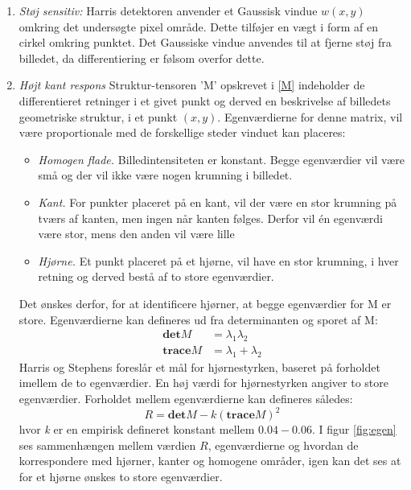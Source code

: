 \begin{enumerate}
\item{\textit{Støj sensitiv:} Harris detektoren anvender et Gaussisk vindue $w(x,y)$ omkring det undersøgte pixel område. Dette tilføjer en vægt i form af en cirkel omkring punktet. Det Gaussiske vindue anvendes til at fjerne støj fra billedet, da differentiering er følsom overfor dette.}
\item{\textit{Højt kant respons} Struktur-tensoren 'M' opskrevet i \eqref{M} indeholder de differentieret retninger i et givet punkt og derved en beskrivelse af billedets geometriske struktur, i et punkt $(x,y)$. Egenværdierne for denne matrix, vil være proportionale med de forskellige steder vinduet kan placeres:
\begin{itemize}
\item{ \textit{Homogen flade.} Billedintensiteten er konstant. Begge egenværdier vil være små og der vil ikke være nogen krumning i billedet.}
\item{\textit{Kant.} For punkter placeret på en kant, vil der være en stor krumning på tværs af kanten, men ingen når kanten følges. Derfor vil én egenværdi være stor, mens den anden vil være lille}
\item{\textit{Hjørne.} Et punkt placeret på et hjørne, vil have en stor krumning, i hver retning og derved bestå af to store egenværdier.}
\end{itemize}
Det ønskes derfor, for at identificere hjørner, at begge egenværdier for M er store. Egenværdierne kan defineres ud fra determinanten og sporet af M:
\begin{subequations}
\begin{align}
\textbf{det}M & = \lambda_1 \lambda_2 \\
\textbf{trace}M & = \lambda_1+\lambda_2
\end{align}
\end{subequations}
Harris og Stephens foreslår et mål for hjørnestyrken, baseret på forholdet imellem de to egenværdier. En høj værdi for hjørnestyrken angiver to store egenværdier. Forholdet mellem egenværdierne kan defineres således:
\begin{equation}
R = \textbf{det}M-k(\textbf{trace}M)^2
\label{rvalharris}
\end{equation}
hvor \textit{k} er en empirisk defineret konstant mellem $0.04-0.06$. I figur \ref{fig:egen} ses sammenhængen mellem værdien $R$, egenværdierne og hvordan de korrespondere med hjørner, kanter og homogene områder, igen kan det ses at for et hjørne ønskes to store egenværdier.
\begin{figure}[H]

\end{figure}}
\end{enumerate}
